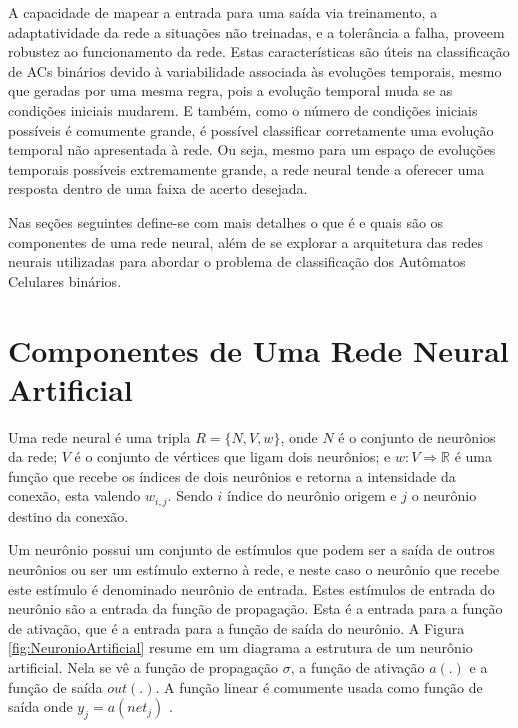 \documentclass[12pt,a4paper]{report}
\begin{document}
	A capacidade de mapear a entrada para uma saída via treinamento, a adaptatividade da rede a situações não treinadas, e a tolerância a falha, proveem robustez ao funcionamento da rede. Estas características são úteis na classificação de ACs binários devido à variabilidade associada às evoluções temporais, mesmo que geradas por uma mesma regra, pois a evolução temporal muda se as condições iniciais mudarem. E também, como o número de condições iniciais possíveis é comumente grande, é possível classificar corretamente uma evolução temporal não apresentada à rede. Ou seja, mesmo para um espaço de evoluções temporais possíveis extremamente grande, a rede neural tende a oferecer uma resposta dentro de uma faixa de acerto desejada.
	
	Nas seções seguintes define-se com mais detalhes o que é e quais são os componentes de uma rede neural, além de se explorar a arquitetura das redes neurais utilizadas para abordar o problema de classificação dos Autômatos Celulares binários.
	
	
	\section{Componentes de Uma Rede Neural Artificial}
	
	Uma rede neural é uma tripla $R=\{N,V,w\}$, onde $N$ é o conjunto de neurônios da rede; $V$ é o conjunto de vértices que ligam dois neurônios; e $w: V \Rightarrow \mathbb{R}$ é uma função que recebe os índices de dois neurônios e retorna a intensidade da conexão, esta valendo $w_{i,j}$. Sendo $i$ índice do neurônio origem e $j$ o neurônio destino da conexão.
	
	Um neurônio possui um conjunto de estímulos que podem ser a saída de outros neurônios ou ser um estímulo externo à rede, e neste caso o neurônio que recebe este estímulo é denominado neurônio de entrada. Estes estímulos de entrada do neurônio são a entrada da função de propagação. Esta é a entrada para a função de ativação, que é a entrada para a função de saída do neurônio. A Figura \ref{fig:NeuronioArtificial} resume em um diagrama a estrutura de um neurônio artificial. Nela se vê a função de propagação $\sigma$, a função de ativação $a(.)$ e a função de saída $out(.)$. A função linear é comumente usada como função de saída onde $y_j=a(net_j)$ \cite{haykin2009neural}. 
	
\end{document}
